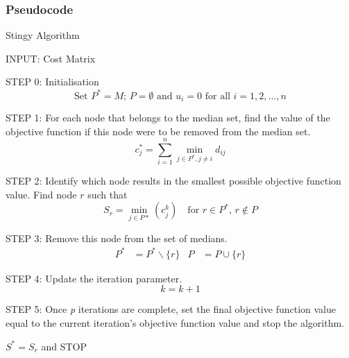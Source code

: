\documentclass[11pt]{article}
\begin{document}
	\subsubsection{Pseudocode}
	\begin{algorithm}
		\caption{Stingy Algorithm}
		\begin{algorithmic}[0]
			
			
			\Statex 
			\Statex INPUT: Cost Matrix
			
			
			\Statex 
			\Statex STEP 0: Initialisation 	
			\begin{equation*}
			\text{Set } P^*=M \text{; } P=\emptyset \text{ and } u_i=0 \text{ for all } i=1,2,\dots,n
			\end{equation*}
			
			\Statex 
			\Statex STEP 1: For each node that belongs to the median set, find the value of the objective function if this node were to be removed from the median set.
			\begin{equation*}
			c_j^* = \sum_{i=1}^{n} \min_{j\in P^*, j\neq i} d_{ij}
			\end{equation*}
			
			\Statex 
			\Statex STEP 2: Identify which node results in the smallest possible objective function value.
			\Statex Find node $r$ such that 
			\begin{equation*}
			S_r = \min_{j \in P*}(c_j^k) \quad \text{for } r \in P^* \text{, } r \notin P
			\end{equation*}
			
			
			\Statex 
			\Statex STEP 3: Remove this node from the set of medians.
			\begin{align*}
			P^* &= P^* \backslash \{r\} & P &= P \cup \{r\}
			\end{align*}
			
			\Statex 
			\Statex STEP 4: Update the iteration parameter.
			\begin{equation*}
			k = k+1
			\end{equation*}
			
			
			\Statex 
			\Statex STEP 5: Once \emph{p} iterations are complete, set the final objective function value equal to the current iteration's objective function value and stop the algorithm.
			\begin{center}
				$S^{*} = S_r$ and STOP
			\end{center}
			
			
		\end{algorithmic}
	\end{algorithm}
\end{document}
